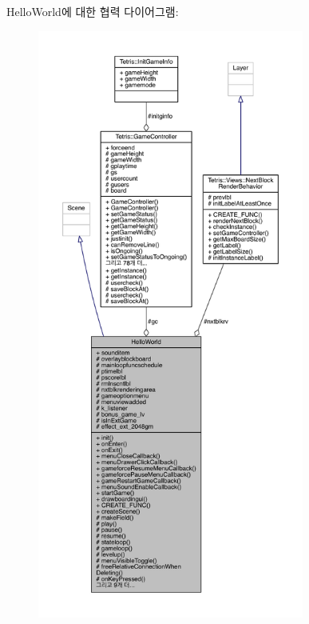 Hello\+World에 대한 협력 다이어그램\+:
\nopagebreak
\begin{figure}[H]
\begin{center}
\leavevmode
\includegraphics[height=550pt]{class_hello_world__coll__graph}
\end{center}
\end{figure}
